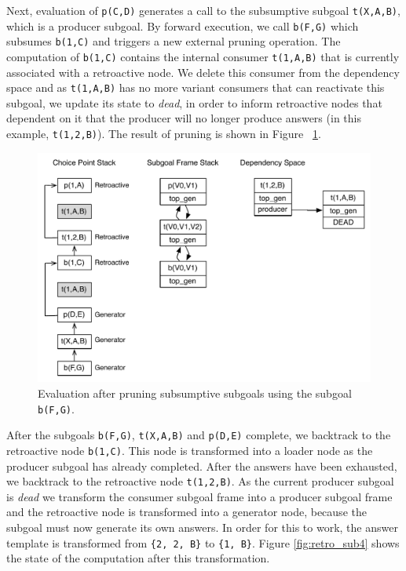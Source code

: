 Next, evaluation of \texttt{p(C,D)} generates a call to the subsumptive subgoal \texttt{t(X,A,B)}, which
is a producer subgoal. By forward execution, we call \texttt{b(F,G)} which subsumes \texttt{b(1,C)} and triggers
a new external pruning operation. The computation of \texttt{b(1,C)} contains the internal consumer
\texttt{t(1,A,B)} that is currently associated with a retroactive node. We delete this consumer from the
dependency space and as \texttt{t(1,A,B)} has no more variant consumers that can reactivate this subgoal,
we update its state to \textit{dead}, in order to inform retroactive nodes that dependent on it that the producer
will no longer produce answers (in this example, \texttt{t(1,2,B)}). The result of pruning is shown in
Figure ~\ref{fig:retro_sub3}.

\begin{figure}[ht]
  \centering
    \includegraphics[scale=0.5]{retro_sub3.pdf}
  \caption{Evaluation after pruning subsumptive subgoals using the subgoal \texttt{b(F,G)}.}
  \label{fig:retro_sub3}
\end{figure}

After the subgoals \texttt{b(F,G)}, \texttt{t(X,A,B)} and \texttt{p(D,E)} complete, we backtrack to
the retroactive node \texttt{b(1,C)}. This node is transformed into a loader node as the producer
subgoal has already completed. After the answers have been exhausted, we backtrack to the retroactive
node \texttt{t(1,2,B)}. As the current producer subgoal is \textit{dead} we transform the consumer subgoal
frame into a producer subgoal frame and the retroactive node is transformed into a generator node, because
the subgoal must now generate its own answers. In order for this to work, the answer template is transformed
from \texttt{\{2,~2,~B\}} to \texttt{\{1,~B\}}. Figure \ref{fig:retro_sub4} shows the state of the computation
after this transformation.

